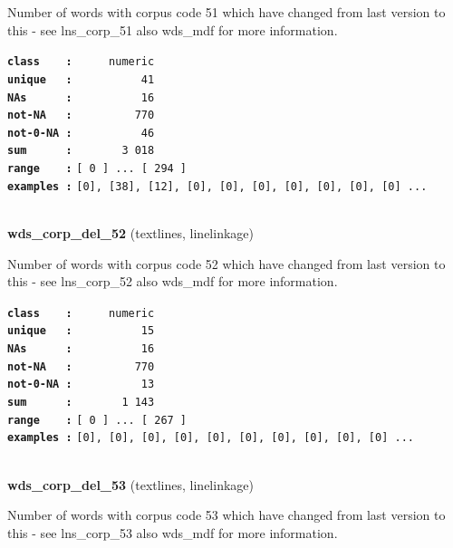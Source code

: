 \documentclass[]{article}
\begin{document}
Number of words with corpus code 51 which have changed from last version
to this - see lns\_corp\_51 also wds\_mdf for more information.

\textbf{\texttt{class\ \ \ \ :}} \texttt{~~~~~numeric}\\
\textbf{\texttt{unique\ \ \ :}} \texttt{~~~~~~~~~~41}\\
\textbf{\texttt{NAs\ \ \ \ \ \ :}} \texttt{~~~~~~~~~~16}\\
\textbf{\texttt{not-NA\ \ \ :}} \texttt{~~~~~~~~~770}\\
\textbf{\texttt{not-0-NA\ :}} \texttt{~~~~~~~~~~46}\\
\textbf{\texttt{sum\ \ \ \ \ \ :}} \texttt{~~~~~~~3~018}\\
\textbf{\texttt{range\ \ \ \ :}}
\texttt{{[}\ 0\ {]}\ ...\ {[}\ 294\ {]}}\\
\textbf{\texttt{examples\ :}}
\texttt{{[}0{]},\ {[}38{]},\ {[}12{]},\ {[}0{]},\ {[}0{]},\ {[}0{]},\ {[}0{]},\ {[}0{]},\ {[}0{]},\ {[}0{]}\ ...}\\

~

\textbf{wds\_corp\_del\_52} (textlines, linelinkage)

Number of words with corpus code 52 which have changed from last version
to this - see lns\_corp\_52 also wds\_mdf for more information.

\textbf{\texttt{class\ \ \ \ :}} \texttt{~~~~~numeric}\\
\textbf{\texttt{unique\ \ \ :}} \texttt{~~~~~~~~~~15}\\
\textbf{\texttt{NAs\ \ \ \ \ \ :}} \texttt{~~~~~~~~~~16}\\
\textbf{\texttt{not-NA\ \ \ :}} \texttt{~~~~~~~~~770}\\
\textbf{\texttt{not-0-NA\ :}} \texttt{~~~~~~~~~~13}\\
\textbf{\texttt{sum\ \ \ \ \ \ :}} \texttt{~~~~~~~1~143}\\
\textbf{\texttt{range\ \ \ \ :}}
\texttt{{[}\ 0\ {]}\ ...\ {[}\ 267\ {]}}\\
\textbf{\texttt{examples\ :}}
\texttt{{[}0{]},\ {[}0{]},\ {[}0{]},\ {[}0{]},\ {[}0{]},\ {[}0{]},\ {[}0{]},\ {[}0{]},\ {[}0{]},\ {[}0{]}\ ...}\\

~

\textbf{wds\_corp\_del\_53} (textlines, linelinkage)

Number of words with corpus code 53 which have changed from last version
to this - see lns\_corp\_53 also wds\_mdf for more information.
\end{document}
